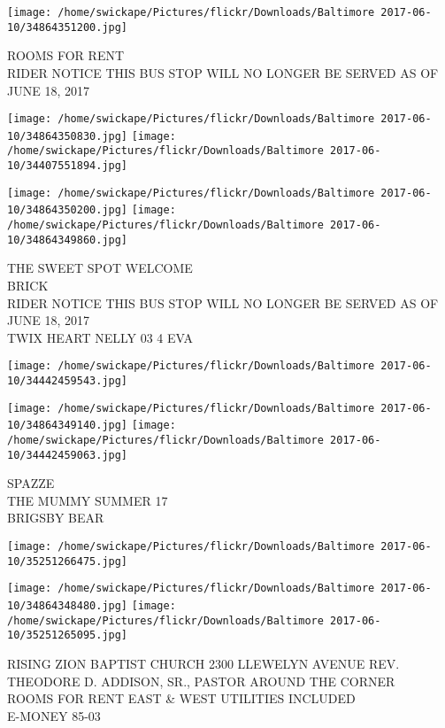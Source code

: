 \documentclass[10pt,letterpaper]{article}
\begin{document}
\vspace{0.25in}
\texttt{[image: /home/swickape/Pictures/flickr/Downloads/Baltimore 2017-06-10/34864351200.jpg]}

ROOMS FOR RENT\\
RIDER NOTICE THIS BUS STOP WILL NO LONGER BE SERVED AS OF JUNE 18, 2017
\pagebreak

\texttt{[image: /home/swickape/Pictures/flickr/Downloads/Baltimore 2017-06-10/34864350830.jpg]}
\texttt{[image: /home/swickape/Pictures/flickr/Downloads/Baltimore 2017-06-10/34407551894.jpg]}

\texttt{[image: /home/swickape/Pictures/flickr/Downloads/Baltimore 2017-06-10/34864350200.jpg]}
\texttt{[image: /home/swickape/Pictures/flickr/Downloads/Baltimore 2017-06-10/34864349860.jpg]}

THE SWEET SPOT WELCOME\\
BRICK\\
RIDER NOTICE THIS BUS STOP WILL NO LONGER BE SERVED AS OF JUNE 18, 2017\\
TWIX HEART NELLY 03 4 EVA
\pagebreak

\texttt{[image: /home/swickape/Pictures/flickr/Downloads/Baltimore 2017-06-10/34442459543.jpg]}

\vspace{0.25in}
\texttt{[image: /home/swickape/Pictures/flickr/Downloads/Baltimore 2017-06-10/34864349140.jpg]}
\texttt{[image: /home/swickape/Pictures/flickr/Downloads/Baltimore 2017-06-10/34442459063.jpg]}

SPAZZE\\
THE MUMMY SUMMER 17\\
BRIGSBY BEAR
\pagebreak

\texttt{[image: /home/swickape/Pictures/flickr/Downloads/Baltimore 2017-06-10/35251266475.jpg]}

\vspace{0.25in}
\texttt{[image: /home/swickape/Pictures/flickr/Downloads/Baltimore 2017-06-10/34864348480.jpg]}
\texttt{[image: /home/swickape/Pictures/flickr/Downloads/Baltimore 2017-06-10/35251265095.jpg]}

RISING ZION BAPTIST CHURCH 2300 LLEWELYN AVENUE REV. THEODORE D. ADDISON, SR., PASTOR AROUND THE CORNER\\
ROOMS FOR RENT EAST \& WEST UTILITIES INCLUDED\\
E{-}MONEY 85{-}03
\pagebreak
\end{document}
